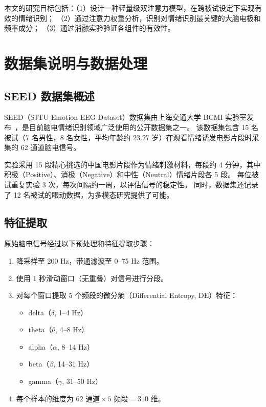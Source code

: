 \documentclass[12pt,a4paper]{ctexart}
\begin{document}
本文的研究目标包括：（1）设计一种轻量级双注意力模型，在跨被试设定下实现有效的情绪识别；
（2）通过注意力权重分析，识别对情绪识别最关键的大脑电极和频率成分；
（3）通过消融实验验证各组件的有效性。


\section{数据集说明与数据处理}

\subsection{SEED 数据集概述}

SEED（SJTU Emotion EEG Dataset）数据集由上海交通大学 BCMI 实验室发布~\cite{zheng2015}，是目前脑电情绪识别领域广泛使用的公开数据集之一。
该数据集包含 15 名被试（7 名男性，8 名女性，平均年龄约 23.27 岁）在观看情绪诱发电影片段时采集的 62 通道脑电信号。

实验采用 15 段精心挑选的中国电影片段作为情绪刺激材料，每段约 4 分钟，其中积极（Positive）、消极（Negative）和中性（Neutral）情绪片段各 5 段。
每位被试重复实验 3 次，每次间隔约一周，以评估信号的稳定性。
同时，数据集还记录了 12 名被试的眼动数据，为多模态研究提供了可能。

\subsection{特征提取}

原始脑电信号经过以下预处理和特征提取步骤：
\begin{enumerate}[itemsep=0pt]
    \item 降采样至 200 Hz，带通滤波至 0--75 Hz 范围。
    \item 使用 1 秒滑动窗口（无重叠）对信号进行分段。
    \item 对每个窗口提取 5 个频段的微分熵（Differential Entropy, DE）特征：
    \begin{itemize}[itemsep=0pt]
        \item delta（$\delta$, 1--4 Hz）
        \item theta（$\theta$, 4--8 Hz）
        \item alpha（$\alpha$, 8--14 Hz）
        \item beta（$\beta$, 14--31 Hz）
        \item gamma（$\gamma$, 31--50 Hz）
    \end{itemize}
    \item 每个样本的维度为 $62 \text{ 通道} \times 5 \text{ 频段} = 310$ 维。
\end{enumerate}
\end{document}
